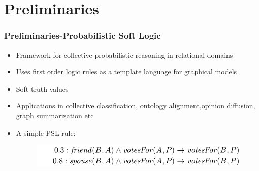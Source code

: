 \documentclass[red,handout]{beamer}
\begin{document}
\section{Preliminaries}
\begin{frame}
\frametitle{Preliminaries-Probabilistic Soft Logic}
    \begin{itemize}[<+->]
        \item
            Framework for collective probabilistic reasoning in relational domains
        \item
            Uses first order logic rules as a template language for graphical models
        \item
            Soft truth values
        \item
            Applications in collective classification, ontology alignment,opinion diffusion, graph summarization etc
        \item
            A simple PSL rule:
            \begin{figure}
                \includegraphics[scale=0.3]{psl_rule_example}
            \end{figure}
    \end{itemize}
\end{frame}

\end{document}
